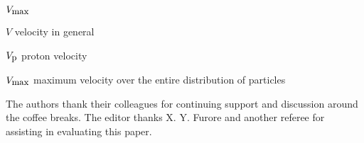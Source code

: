 \documentclass[jgrga]{aguplus}                     %
\begin{document}
\begin{article}
\begin{notation}{$V_{\mbox{\small max}}$}
  \item[$V$]  velocity in general
  \item[$V_{\mbox{\small p}}$]
              proton velocity
  \item[$V_{\mbox{\small max}}$]
              maximum velocity over the entire distribution of particles
\end{notation}

\acknowledgments %
The authors thank their colleagues for continuing support and discussion
around the coffee breaks. The editor thanks X. Y. Furore and another referee
for assisting in evaluating this paper.




\end{article} %
\end{document}
